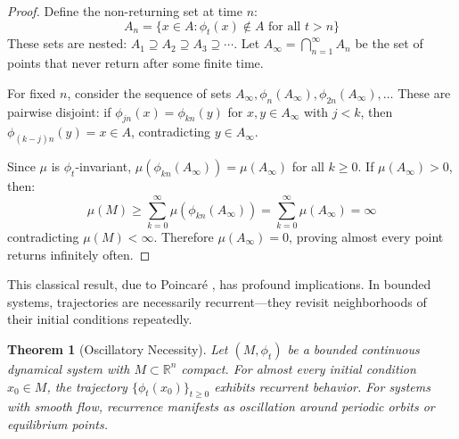 \documentclass[twocolumn,10pt,a4paper]{article}
\newtheorem{theorem}{Theorem}[section]
\newcommand{\R}{\mathbb{R}}
\begin{document}
\begin{proof}
Define the non-returning set at time $n$:
\begin{equation}
A_n = \{x \in A : \phi_t(x) \notin A \text{ for all } t > n\}
\end{equation}
These sets are nested: $A_1 \supseteq A_2 \supseteq A_3 \supseteq \cdots$. Let $A_\infty = \bigcap_{n=1}^\infty A_n$ be the set of points that never return after some finite time.

For fixed $n$, consider the sequence of sets $A_\infty, \phi_n(A_\infty), \phi_{2n}(A_\infty), \ldots$ These are pairwise disjoint: if $\phi_{jn}(x) = \phi_{kn}(y)$ for $x, y \in A_\infty$ with $j < k$, then $\phi_{(k-j)n}(y) = x \in A$, contradicting $y \in A_\infty$.

Since $\mu$ is $\phi_t$-invariant, $\mu(\phi_{kn}(A_\infty)) = \mu(A_\infty)$ for all $k \geq 0$. If $\mu(A_\infty) > 0$, then:
\begin{equation}
\mu(M) \geq \sum_{k=0}^\infty \mu(\phi_{kn}(A_\infty)) = \sum_{k=0}^\infty \mu(A_\infty) = \infty
\end{equation}
contradicting $\mu(M) < \infty$. Therefore $\mu(A_\infty) = 0$, proving almost every point returns infinitely often.
\end{proof}

This classical result, due to Poincar\'{e} \citep{poincare1890probleme}, has profound implications. In bounded systems, trajectories are necessarily recurrent---they revisit neighborhoods of their initial conditions repeatedly.

\begin{theorem}[Oscillatory Necessity]
\label{thm:oscillation}
Let $(M, \phi_t)$ be a bounded continuous dynamical system with $M \subset \R^n$ compact. For almost every initial condition $x_0 \in M$, the trajectory $\{\phi_t(x_0)\}_{t \geq 0}$ exhibits recurrent behavior. For systems with smooth flow, recurrence manifests as oscillation around periodic orbits or equilibrium points.
\end{theorem}
\end{document}
